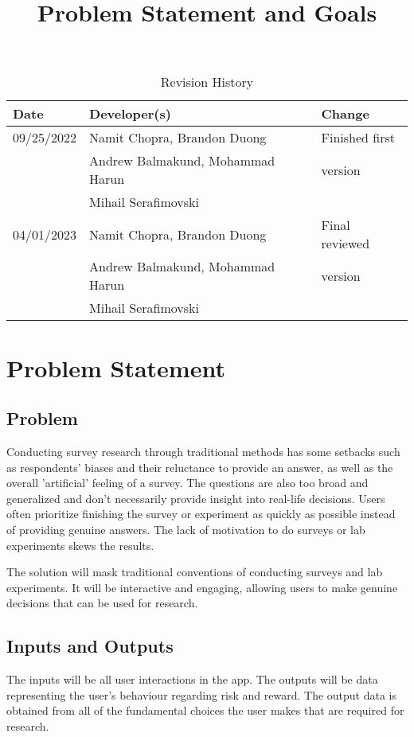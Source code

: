 \documentclass{article}
\title{Problem Statement and Goals\\\progname}
\author{\authname}
\date{}
\begin{document}
\maketitle

\begin{table}[hp]
\caption{Revision History} \label{TblRevisionHistory}
\begin{tabularx}{\textwidth}{llX}
\toprule
\textbf{Date} & \textbf{Developer(s)} & \textbf{Change}\\
\midrule
 09/25/2022 & Namit Chopra, Brandon Duong  & Finished first \\
 & Andrew Balmakund, Mohammad Harun & version\\
 & Mihail Serafimovski & \\
 04/01/2023 & Namit Chopra, Brandon Duong  & Final reviewed \\
 & Andrew Balmakund, Mohammad Harun & version \\
 & Mihail Serafimovski & \\
\bottomrule
\end{tabularx}
\end{table}

\section{Problem Statement}


\subsection{Problem}
Conducting survey research through traditional methods has some setbacks such as respondents' biases and their reluctance to provide an answer, as well as the overall 'artificial' feeling of a survey. The questions are also too broad and generalized and don't necessarily provide insight into real-life decisions. Users often prioritize finishing the survey or experiment as quickly as possible instead of providing genuine answers. The lack of motivation to do surveys or lab experiments skews the results.

The solution will mask traditional conventions of conducting surveys and lab experiments. It will be interactive and engaging, allowing users to make genuine decisions that can be used for research.

\subsection{Inputs and Outputs}
The inputs will be all user interactions in the app. The outputs will be data representing the user's behaviour regarding risk and reward. The output data is obtained from all of the fundamental choices the user makes that are required for research. 
\end{document}
